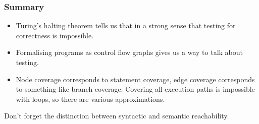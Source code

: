 \documentclass[handout]{beamer}
\begin{document}
\begin{frame}
  \frametitle{Summary}
  \begin{itemize}
  \item Turing's halting theorem tells us that in a strong sense that testing
    for correctness is impossible.
  \item Formalising programs as control flow graphs gives us a way to talk
    about testing.
  \item Node coverage corresponds to statement coverage, edge coverage
    corresponds to something like branch coverage. Covering all execution
    paths is impossible with loops, so there are various approximations.
  \end{itemize}
  Don't forget the distinction between syntactic and semantic reachability. 
\end{frame}
\end{document}
